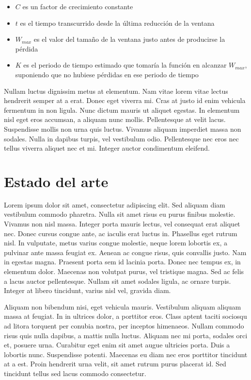 \begin{itemize}
\item $C$ es un factor de crecimiento constante
\item $t$ es el tiempo transcurrido desde la última reducción de la ventana
\item $W_{max}$ es el valor del tamaño de la ventana justo antes de producirse la pérdida
\item $K$ es el periodo de tiempo estimado que tomaría la función en alcanzar $W_{max}$, suponiendo que no hubiese pérdidas en ese periodo de tiempo
\end{itemize}

Nullam luctus dignissim metus at elementum. Nam vitae lorem vitae lectus hendrerit semper at a erat. Donec eget viverra mi. Cras at justo id enim vehicula fermentum in non ligula. Nunc dictum mauris ut aliquet egestas. In elementum nisl eget eros accumsan, a aliquam nunc mollis. Pellentesque at velit lacus. Suspendisse mollis non urna quis luctus. Vivamus aliquam imperdiet massa non sodales. Nulla in dapibus turpis, vel vestibulum odio. Pellentesque nec eros nec tellus viverra aliquet nec et mi. Integer auctor condimentum eleifend.


\chapter{Estado del arte}

Lorem ipsum dolor sit amet, consectetur adipiscing elit. Sed aliquam diam vestibulum commodo pharetra. Nulla sit amet risus eu purus finibus molestie. Vivamus non nisl massa. Integer porta mauris lectus, vel consequat erat aliquet nec. Donec cursus congue ante, ac iaculis erat luctus in. Phasellus eget rutrum nisl. In vulputate, metus varius congue molestie, neque lorem lobortis ex, a pulvinar ante massa feugiat ex. Aenean ac congue risus, quis convallis justo. Nam in egestas magna. Praesent porta sem id lacinia porta. Donec nec tempus ex, in elementum dolor. Maecenas non volutpat purus, vel tristique magna. Sed ac felis a lacus auctor pellentesque. Nullam sit amet sodales ligula, ac ornare turpis. Integer at libero tincidunt, varius nisl vel, gravida diam.

Aliquam non bibendum nisi, eget vehicula mauris. Vestibulum aliquam aliquam massa at feugiat. In in ultrices dolor, a porttitor eros. Class aptent taciti sociosqu ad litora torquent per conubia nostra, per inceptos himenaeos. Nullam commodo risus quis nulla dapibus, a mattis nulla luctus. Aliquam nec mi porta, sodales orci et, posuere urna. Curabitur eget enim sit amet augue ultricies porta. Duis a lobortis nunc. Suspendisse potenti. Maecenas eu diam nec eros porttitor tincidunt at a est. Proin hendrerit urna velit, sit amet rutrum purus placerat id. Sed tincidunt tellus sed lacus commodo consectetur.

